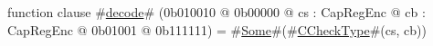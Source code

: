 function clause #\hyperref[zdecode]{decode}# (0b010010 @ 0b00000 @ cs : CapRegEnc @ cb : CapRegEnc @    0b01001 @ 0b111111) = #\hyperref[zSome]{Some}#(#\hyperref[zCCheckType]{CCheckType}#(cs, cb))
